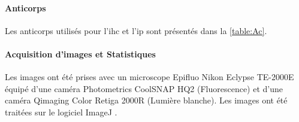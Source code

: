 	\paragraph{Anticorps}
	\label{par:anticorps}
	Les anticorps utilisés pour l'\gls{ihc}{} et l'\gls{ip}{} sont présentés dans la \cref{table:Ac}.
	
	\begin{table}[h]
	\end{table} 
\FloatBarrier
	
\paragraph{Acquisition d'images et Statistiques}
\label{par:ImagesStats}
	Les images ont été prises avec un microscope Epifluo Nikon Eclypse TE-2000E équipé d'une caméra Photometrics CoolSNAP HQ2 (Fluorescence) et d'une caméra Qimaging Color Retiga 2000R (Lumière blanche).
	Les images ont été traitées sur le logiciel ImageJ \cite{Schneider2012}.
